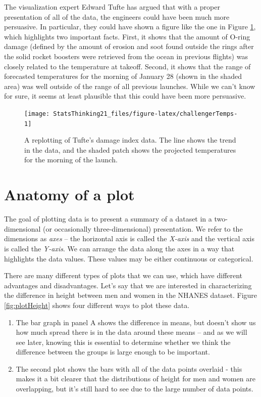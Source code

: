 \documentclass[12pt,]{book}
\providecommand{\tightlist}{%
  \setlength{\itemsep}{0pt}\setlength{\parskip}{0pt}}
\theoremstyle{definition}
\theoremstyle{definition}
\theoremstyle{definition}
\theoremstyle{remark}
\begin{document}
The visualization expert Edward Tufte has argued that with a proper presentation of all of the data, the engineers could have been much more persuasive. In particular, they could have shown a figure like the one in Figure \ref{fig:challengerTemps}, which highlights two important facts. First, it shows that the amount of O-ring damage (defined by the amount of erosion and soot found outside the rings after the solid rocket boosters were retrieved from the ocean in previous flights) was closely related to the temperature at takeoff. Second, it shows that the range of forecasted temperatures for the morning of January 28 (shown in the shaded area) was well outside of the range of all previous launches. While we can't know for sure, it seems at least plausible that this could have been more persuasive.

\begin{figure}
\texttt{[image: StatsThinking21\_files/figure-latex/challengerTemps-1]} \caption{A replotting of Tufte's damage index data. The line shows the trend in the data, and the shaded patch shows the projected temperatures for the morning of the launch.}\label{fig:challengerTemps}
\end{figure}

\hypertarget{anatomy-of-a-plot}{%
\section{Anatomy of a plot}\label{anatomy-of-a-plot}}

The goal of plotting data is to present a summary of a dataset in a two-dimensional (or occasionally three-dimensional) presentation. We refer to the dimensions as \emph{axes} -- the horizontal axis is called the \emph{X-axis} and the vertical axis is called the \emph{Y-axis}. We can arrange the data along the axes in a way that highlights the data values. These values may be either continuous or categorical.

There are many different types of plots that we can use, which have different advantages and disadvantages. Let's say that we are interested in characterizing the difference in height between men and women in the NHANES dataset. Figure \ref{fig:plotHeight} shows four different ways to plot these data.

\begin{enumerate}
\def\labelenumi{\arabic{enumi}.}
\tightlist
\item
  The bar graph in panel A shows the difference in means, but doesn't show us how much spread there is in the data around these means -- and as we will see later, knowing this is essential to determine whether we think the difference between the groups is large enough to be important.\\
\item
  The second plot shows the bars with all of the data points overlaid - this makes it a bit clearer that the distributions of height for men and women are overlapping, but it's still hard to see due to the large number of data points.
\end{enumerate}
\end{document}

